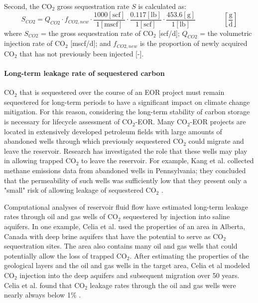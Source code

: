 \documentclass[11pt]{report}
\newcommand{\eqnunitfrac}[2]{\quad\quad \scriptstyle{\left[\frac{\text{#1}}{\text{#2}}\right]}}
\begin{document}
Second, the CO$_2$ gross sequestration rate $S$ is calculated as: 
\begin{equation} \label{eq:CO2Sequestration}
S_{CO2} = Q_{CO2} \cdot f_{CO2,new} \cdot \frac{1000 [\text{scf}]}{1 [\text{mscf}]} \cdot \frac{0.117 [\text{lb}]}{1 [\text{scf}]} \cdot \frac{453.6 [\text{g}]}{1 [\text{lb}]} \quad\quad\eqnunitfrac{g}{d}
\end{equation}
where $S_{CO2}$ = the gross sequestration rate of CO$_2$ [scf/d]; $Q_{CO2}$ = the volumetric injection rate of CO$_2$ [mscf/d]; and $f_{CO2,new}$ is the proportion of newly acquired CO$_2$ that has not previously been injected [-].


\paragraph{Long-term leakage rate of sequestered carbon} \label{par:LongTermLeakageRate}
CO$_2$ that is sequestered over the course of an EOR project must remain sequestered for long-term periods to have a significant impact on climate change mitigation. For this reason, considering the long-term stability of carbon storage is necessary for lifecycle assessment of CO$_2$-EOR.  Many CO$_2$-EOR projects are located in extensively developed petroleum fields with large amounts of abandoned wells through which previously sequestered CO$_2$ could migrate and leave the reservoir. Research has investigated the role that these wells may play in allowing trapped CO$_2$ to leave the reservoir. For example, Kang et al. collected methane emissions data from abandoned wells in Pennsylvania; they concluded that the permeability of such wells was sufficiently low that they present only a "small" risk of allowing leakage of sequestered CO$_2$ \cite{Kang2015}.  

Computational analyses of reservoir fluid flow have estimated long-term leakage rates through oil and gas wells of CO$_2$ sequestered by injection into saline aquifers. In one example, Celia et al. \cite{Celia2011} used the properties of an area in Alberta, Canada with deep brine aquifers that have the potential to serve as CO$_2$ sequestration sites. The area also contains many oil and gas wells that could potentially allow the loss of trapped CO$_2$. After estimating the properties of the geological layers and the oil and gas wells in the target area, Celia et al modeled CO$_2$ injection into the deep aquifers and subsequent migration over 50 years. Celia et al. found that CO$_2$ leakage rates through the oil and gas wells were nearly always below 1\%  \cite{Celia2011}.
\end{document}
